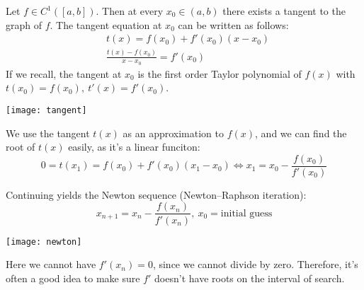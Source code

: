 \begin{definition}
    Let $f \in C^1([a, b])$. Then at every 
    $x_0 \in (a, b)$ there exists a tangent to the graph of $f$.
    The tangent equation at $x_0$ can be written as follows:
    \begin{align*}
        &
        t(x) = f(x_0) + f'(x_0)(x - x_0)
        \\&
        \frac{t(x) - f(x_0)}{x - x_0} = f'(x_0)
    \end{align*}
    If we recall, the tangent at $x_0$ is the first order Taylor polynomial of $f(x)$
    with $t(x_0) = f(x_0),\ t'(x) = f'(x_0)$.
    \pagebreak
    \begin{figure*}[h]
        \centering
        \texttt{[image: tangent]}
    \end{figure*}

    We use the tangent $t(x)$ as an approximation to $f(x)$,
    and we can find the root of $t(x)$ easily, as it's a linear funciton:
    \[
        0 = t(x_1) = f(x_0) + f'(x_0)(x_1 - x_0) \Longleftrightarrow
        x_1 = x_0 - \frac{f(x_0)}{f'(x_0)}
    \]

    Continuing yields the Newton sequence (Newton–Raphson iteration):
    \[ x_{n + 1} = x_n - \frac{f(x_n)}{f'(x_n)},\ x_0 = \text{initial guess} \]

    \begin{figure*}[h]
        \centering
        \texttt{[image: newton]}
    \end{figure*}

    Here we cannot have $f'(x_n) = 0$, since we cannot divide by zero. Therefore,
    it's often a good idea to make sure $f'$ doesn't have roots on the interval
    of search.
\end{definition}
